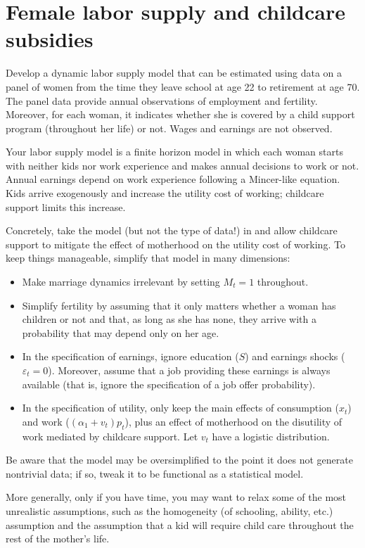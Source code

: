 \documentclass[fleqn,12pt]{article}
\theoremstyle{plain}
\theoremstyle{definition}
\begin{document}
\section*{Female labor supply and childcare subsidies}

Develop a dynamic labor supply model that can be estimated using data on a panel of women from the time they leave school at age 22 to retirement at age 70. The panel data provide annual observations of employment and fertility. Moreover, for each woman, it indicates whether she is covered by a child support program (throughout her life) or not. Wages and earnings are not observed. 

Your labor supply model is a finite horizon model in which each woman starts with neither kids nor work experience and makes annual decisions to work or not. Annual earnings depend on work experience following a Mincer-like equation. Kids arrive exogenously and increase the utility cost of working; childcare support limits this increase. 

Concretely, take the model (but not the type of data!) in \citet[][Section 3]{https://doi.org/10.3982/ECTA8803} and allow childcare support to mitigate the effect of motherhood on the utility cost of working. To keep things manageable, simplify that model in many dimensions:
\begin{itemize}
\item Make marriage dynamics irrelevant by setting  $M_t=1$ throughout.
\item Simplify fertility by assuming that it only matters whether a woman has children or not and that, as long as she has none, they arrive with a probability that may depend only on her age. 
\item In the specification of earnings, ignore education ($S$) and earnings shocks ($\varepsilon_t=0$). Moreover, assume that a job providing these earnings is always available (that is, ignore the specification of a job offer probability).
\item In the specification of utility, only keep the main effects of consumption ($x_t$) and work ($(\alpha_1+v_t)p_t$), plus an effect of motherhood on the disutility of work mediated by childcare support. Let  $v_t$ have a logistic distribution.
\end{itemize}
Be aware that the model may be oversimplified to the point it does not generate nontrivial data; if so, tweak it to be functional as a statistical model. 

More generally, only if you have time, you may want to relax some of the most unrealistic assumptions, such as the homogeneity (of schooling, ability, etc.) assumption and the assumption that a kid will require child care throughout the rest of the mother's life. 



\end{document}
